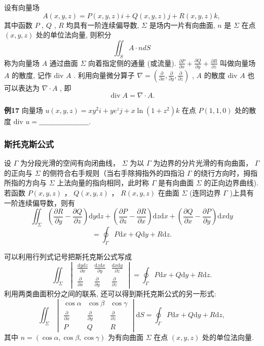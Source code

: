 设有向量场
\[A(x,y,z) = P(x,y,z)i + Q(x,y,z)j + R(x,y,z)k,\]
其中函数 \(P\) , \(Q\) , \(R\) 均具有一阶连续偏导数, \(\Sigma\) 是场内一片有向曲面, \(n\) 是 \(\Sigma\) 在点 \((x,y,z)\) 处的单位法向量, 则积分
\[\iint_{S}A\cdot ndS\]
称为向量场 \(A\) 通过曲面 \(\Sigma\) 向着指定侧的通量 (或流量).
\(\frac{\partial P}{\partial x} +\frac{\partial Q}{\partial y} +\frac{\partial R}{\partial z}\) 叫做向量场 \(A\) 的散度, 记作 div \(A\) . 利用向量微分算子 \(\nabla = \left(\frac{\partial}{\partial x}, \frac{\partial}{\partial y}, \frac{\partial}{\partial z}\right)\) , \(A\) 的散度 div \(A\) 也可以表达为 \(\nabla \cdot A\) , 即
\[\operatorname {div} A = \nabla \cdot A.\]

\textbf{例17} 向量场 \(u(x, y, z) = xy^2i + ye^z j + x \ln(1 + z^2)k\) 在点 \(P(1, 1, 0)\) 处的散度 \(\text{div } u = \_\_\_\_\_\_\_\_\_\_\_\_\_\_\_\_\_\_\_\_\_.\)


\subsubsection*{斯托克斯公式}


设 \(\Gamma\) 为分段光滑的空间有向闭曲线， \(\Sigma\) 为以 \(\Gamma\) 为边界的分片光滑的有向曲面， \(\Gamma\) 的正向与 \(\Sigma\) 的侧符合右手规则（当右手除拇指外的四指沿 \(\Gamma\) 的绕行方向时，拇指所指的方向与 \(\Sigma\) 上法向量的指向相同，此时称 \(\Gamma\) 是有向曲面 \(\Sigma\) 的正向边界曲线).若函数 \(P(x,y,z)\) ， \(Q(x,y,z)\) ， \(R(x,y,z)\) 在曲面 \(\Sigma\) (连同边界 \(\Gamma\) )上具有一阶连续偏导数，则有
\[\iint_{\Sigma}\left(\frac{\partial R}{\partial y} -\frac{\partial Q}{\partial z}\right)\mathrm{d}y\mathrm{d}z + \left(\frac{\partial P}{\partial z} -\frac{\partial R}{\partial x}\right)\mathrm{d}z\mathrm{d}x + \left(\frac{\partial Q}{\partial x} -\frac{\partial P}{\partial y}\right)\mathrm{d}x\mathrm{d}y\] \[= \oint_{\Gamma}P\mathrm{d}x + Q\mathrm{d}y + R\mathrm{d}z.\]

可以利用行列式记号把斯托克斯公式写成
\[ \iint_{\Sigma} \begin{vmatrix} \frac{\mathrm{d}y\mathrm{d}z}{\partial x} & \frac{\mathrm{d}z\mathrm{d}x}{\partial y} & \frac{\mathrm{d}x\mathrm{d}y}{\partial z} \\ \frac{\partial}{\partial x} & \frac{\partial}{\partial y} & \frac{\partial}{\partial z} \end{vmatrix} = \oint_{\Gamma} P\mathrm{d}x + Q\mathrm{d}y + R\mathrm{d}z. \]
利用两类曲面积分之间的联系, 还可以得到斯托克斯公式的另一形式:
\[ \iint_{\Sigma} \begin{vmatrix} \cos\alpha & \cos\beta & \cos\gamma \\ \frac{\partial}{\partial x} & \frac{\partial}{\partial y} & \frac{\partial}{\partial z} \\ P & Q & R \end{vmatrix} \mathrm{d}S = \oint_{\Gamma} P\mathrm{d}x + Q\mathrm{d}y + R\mathrm{d}z, \]
其中 \(n = (\cos\alpha, \cos\beta, \cos\gamma)\) 为有向曲面 \(\Sigma\) 在点 \((x, y, z)\) 处的单位法向量.

